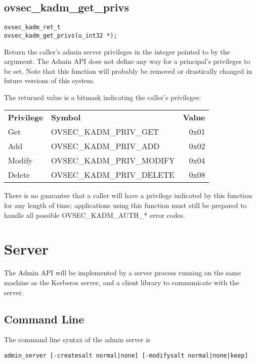 \subsection{ovsec_kadm_get_privs}

\begin{verbatim}
ovsec_kadm_ret_t
ovsec_kadm_get_privs(u_int32 *);
\end{verbatim}

Return the caller's admin server privileges in the integer pointed to
by the argument.  The Admin API does not define any way for a
principal's privileges to be set.  Note that this function will
probably be removed or drastically changed in future versions of this
system.

The returned value is a bitmask indicating the caller's privileges:

\begin{tabular}{llr}
{\bf Privilege} & {\bf Symbol} & {\bf Value} \\
Get & OVSEC_KADM_PRIV_GET & 0x01 \\
Add & OVSEC_KADM_PRIV_ADD & 0x02 \\
Modify & OVSEC_KADM_PRIV_MODIFY & 0x04 \\
Delete & OVSEC_KADM_PRIV_DELETE & 0x08
\end{tabular}

There is no guarantee that a caller will have a privilege indicated by
this function for any length of time; applications using this function
must still be prepared to handle all possible OVSEC_KADM_AUTH_* error
codes.

\section{Server}

The Admin API will be implemented by a server process running on the
same machine as the Kerberos server, and a client library to
communicate with the server.

\subsection{Command Line}
\label{sec:commandline}

The command line syntax of the admin server is

\begin{verbatim}
admin_server [-createsalt normal|none] [-modifysalt normal|none|keep]
\end{verbatim}

